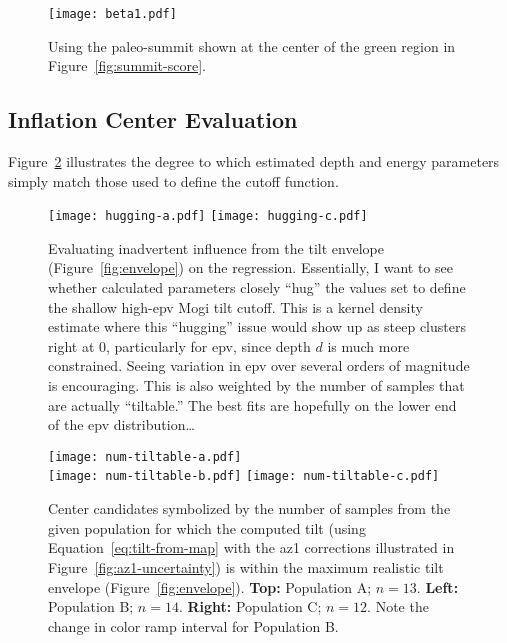 \begin{figure}
    \texttt{[image: beta1.pdf]}%
    \caption[Best Paleo-Summit Candidate]{Using the paleo-summit shown at the center of the green region in Figure~\ref{fig:summit-score}.}%
    \label{fig:beta1}
\end{figure}

\subsection{Inflation Center Evaluation}

Figure~\ref{fig:hugging} illustrates the degree to which estimated depth and energy parameters simply match those used to define the cutoff function.

\begin{figure}
    \texttt{[image: hugging-a.pdf]}
    \texttt{[image: hugging-c.pdf]}
    \caption[Check for envelope ``hugging'']{Evaluating inadvertent influence from the tilt envelope (Figure~\ref{fig:envelope}) on the regression. Essentially, I want to see whether calculated parameters closely ``hug'' the values set to define the shallow high-\acs{epv} Mogi tilt cutoff. This is a kernel density estimate where this ``hugging'' issue would show up as steep clusters right at 0, particularly for \acs{epv}, since depth $d$ is much more constrained. Seeing variation in \acs{epv} over several orders of magnitude is encouraging. This is also weighted by the number of samples that are actually ``tiltable.'' The best fits are hopefully on the lower end of the \acs{epv} distribution\dots} 
    \label{fig:hugging}
\end{figure}

 \begin{figure}
    \begin{center}
     \texttt{[image: num-tiltable-a.pdf]}\\
     \texttt{[image: num-tiltable-b.pdf]}%
     \texttt{[image: num-tiltable-c.pdf]}
     \caption[Inflation Center Candidates by number of ``tiltable'' samples]{Center candidates symbolized by the number of samples from the given population for which the computed tilt (using Equation~\eqref{eq:tilt-from-map} with the \acs{az1} corrections illustrated in Figure~\ref{fig:az1-uncertainty}) is within the maximum realistic tilt envelope (Figure~\ref{fig:envelope}). \textbf{Top:} Population A; $n=13$. \textbf{Left:} Population B; $n=14$. \textbf{Right:} Population C; $n=12$. Note the change in color ramp interval for Population B.} 
     \label{fig:num-tiltable}
    \end{center}
\end{figure}

